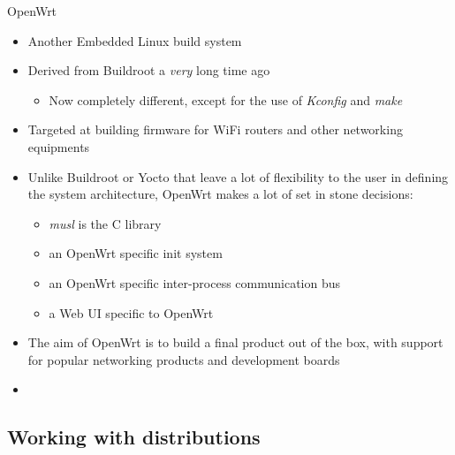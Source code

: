 \begin{frame}{OpenWrt}
  \begin{itemize}
  \item Another Embedded Linux build system
  \item Derived from Buildroot a {\em very} long time ago
    \begin{itemize}
    \item Now completely different, except for the use of {\em Kconfig} and {\em make}
    \end{itemize}
  \item Targeted at building firmware for WiFi routers and other
    networking equipments
  \item Unlike Buildroot or Yocto that leave a lot of flexibility to
    the user in defining the system architecture, OpenWrt makes a lot
    of set in stone decisions:
    \begin{itemize}
    \item {\em musl} is the C library
    \item an OpenWrt specific init system
    \item an OpenWrt specific inter-process communication bus
    \item a Web UI specific to OpenWrt
    \end{itemize}
  \item The aim of OpenWrt is to build a final product out of the box,
    with support for popular networking products and development
    boards
  \item {}
  \end{itemize}
\end{frame}

\subsection{Working with distributions}


